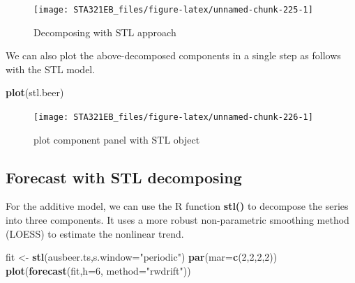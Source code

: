 \documentclass[
]{book}
\newenvironment{Shaded}{\begin{snugshade}}{\end{snugshade}}
\newcommand{\AttributeTok}[1]{\textcolor[rgb]{0.13,0.29,0.53}{#1}}
\newcommand{\DecValTok}[1]{\textcolor[rgb]{0.00,0.00,0.81}{#1}}
\newcommand{\FunctionTok}[1]{\textcolor[rgb]{0.13,0.29,0.53}{\textbf{#1}}}
\newcommand{\NormalTok}[1]{#1}
\newcommand{\OtherTok}[1]{\textcolor[rgb]{0.56,0.35,0.01}{#1}}
\newcommand{\StringTok}[1]{\textcolor[rgb]{0.31,0.60,0.02}{#1}}
\begin{document}
\begin{figure}

{\centering \texttt{[image: STA321EB\_files/figure-latex/unnamed-chunk-225-1]} 

}

\caption{Decomposing with STL approach}\label{fig:unnamed-chunk-225}
\end{figure}

We can also plot the above-decomposed components in a single step as follows with the STL model.

\begin{Shaded}
\begin{Highlighting}[]
\FunctionTok{plot}\NormalTok{(stl.beer)}
\end{Highlighting}
\end{Shaded}

\begin{figure}

{\centering \texttt{[image: STA321EB\_files/figure-latex/unnamed-chunk-226-1]} 

}

\caption{plot component panel with STL object}\label{fig:unnamed-chunk-226}
\end{figure}

\hypertarget{forecast-with-stl-decomposing}{%
\subsection{Forecast with STL decomposing}\label{forecast-with-stl-decomposing}}

For the additive model, we can use the R function \textbf{stl()} to decompose the series into three components. It uses a more robust non-parametric smoothing method (LOESS) to estimate the nonlinear trend.

\begin{Shaded}
\begin{Highlighting}[]
\NormalTok{fit }\OtherTok{\textless{}{-}} \FunctionTok{stl}\NormalTok{(ausbeer.ts,}\AttributeTok{s.window=}\StringTok{"periodic"}\NormalTok{)}
\FunctionTok{par}\NormalTok{(}\AttributeTok{mar=}\FunctionTok{c}\NormalTok{(}\DecValTok{2}\NormalTok{,}\DecValTok{2}\NormalTok{,}\DecValTok{2}\NormalTok{,}\DecValTok{2}\NormalTok{))}
\FunctionTok{plot}\NormalTok{(}\FunctionTok{forecast}\NormalTok{(fit,}\AttributeTok{h=}\DecValTok{6}\NormalTok{, }\AttributeTok{method=}\StringTok{"rwdrift"}\NormalTok{))}
\end{Highlighting}
\end{Shaded}
\end{document}
